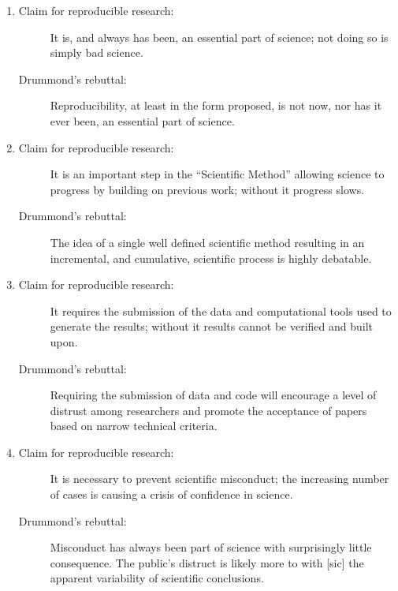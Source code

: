 \documentclass{book}
\begin{document}
\begin{enumerate}
\item 
\begin{description}
\item[Claim for reproducible research:] It is, and always has been, an essential part of science; not doing so is simply bad science.
\item[Drummond's rebuttal:] Reproducibility, at least in the form proposed, is not now, nor has it ever been, an essential part of science.
\end{description}
\item 
\begin{description}
\item[Claim for reproducible research:] It is an important step in the ``Scientific Method'' allowing science to progress by building on previous work; without it progress slows.
\item[Drummond's rebuttal:] The idea of a single well defined scientific method resulting in an incremental, and cumulative, scientific process is highly debatable.
\end{description}
\item 
\begin{description}
\item[Claim for reproducible research:] It requires the submission of the data and computational tools used to generate the results; without it results cannot be verified and built upon.
\item[Drummond's rebuttal:] Requiring the submission of data and code will encourage a level of distrust among researchers and promote the acceptance of papers based on narrow technical criteria.
\end{description}
\item 
\begin{description}
\item[Claim for reproducible research:] It is necessary to prevent scientific misconduct; the increasing number of cases is causing a crisis of confidence in science.
\item[Drummond's rebuttal:] Misconduct has always been part of science with surprisingly little consequence. The public's distruct is likely more to with [sic] the apparent variability of scientific conclusions.
\end{description}
\end{enumerate}
\end{document}
